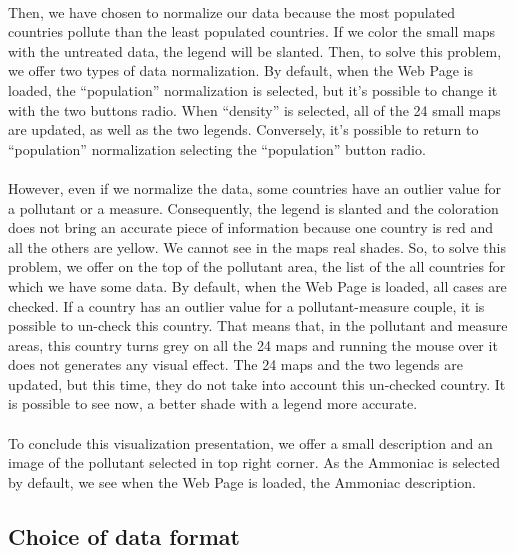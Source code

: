 \documentclass[preprint,journal]{vgtc}       %
\begin{document}
\paragraph{}
Then, we have chosen to normalize our data because the most populated countries pollute than the least populated countries. If we color the small maps with the untreated data, the legend will be slanted. Then, to solve this problem, we offer two types of data normalization. By default, when the Web Page is loaded, the “population” normalization is selected, but it’s possible to change it with the two buttons radio. When “density” is selected, all of the 24 small maps are updated, as well as the two legends. Conversely, it’s possible to return to “population” normalization selecting the “population” button radio. 
\paragraph{}
However, even if we normalize the data, some countries have an outlier value for a pollutant or a measure. Consequently, the legend is slanted and the coloration does not bring an accurate piece of information because one country is red and all the others are yellow. We cannot see in the maps real shades. 
\newline
So, to solve this problem, we offer on the top of the pollutant area, the list of the all countries for which we have some data. By default, when the Web Page is loaded, all cases are checked. If a country has an outlier value for a pollutant-measure couple, it is possible to un-check this country. That means that, in the pollutant and measure areas, this country turns grey on all the 24 maps and running the mouse over it does not generates any visual effect.  The 24 maps and the two legends are updated, but this time, they do not take into account this un-checked country. It is possible to see now, a better shade with a legend more accurate.
\paragraph{}
To conclude this visualization presentation, we offer a small description and an image of the pollutant selected in top right corner. As the Ammoniac is selected by default, we see when the Web Page is loaded, the Ammoniac description.

	\subsection{Choice of data format}
\end{document}
